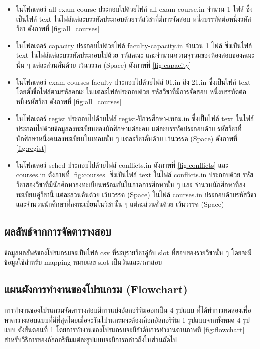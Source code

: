 \begin{itemize}
  \item ในโฟลเดอร์ all-exam-course ประกอบไปด้วยไฟล์ all-exam-course.in จำนวน 1 ไฟล์ ซึ่งเป็นไฟล์ text ในไฟล์แต่ละบรรทัดประกอบด้วยรหัสวิชาที่มีการจัดสอบ หนึ่งบรรทัดต่อหนึ่งรหัสวิชา ดังภาพที่ \ref{fig:all_courses}
  \item ในโฟลเดอร์ capacity ประกอบไปด้วยไฟล์ faculty-capacity.in จำนวน 1 ไฟล์ ซึ่งเป็นไฟล์ text ในไฟล์แต่ละบรรทัดประกอบไปด้วย รหัสคณะ และจำนวนความจุรวมของห้องสอบของคณะนั้น ๆ แต่ละส่วนคั่นด้วย เว้นวรรค (Space) ดังภาพที่ \ref{fig:capacity}
  \item ในโฟลเดอร์ exam-courses-faculty ประกอบไปด้วยไฟล์ 01.in ถึง 21.in ซึ่งเป็นไฟล์ text โดยตั้งชื่อไฟล์ตามรหัสคณะ ในแต่ละไฟล์ประกอบด้วย รหัสวิชาที่มีการจัดสอบ หนึ่งบรรทัดต่อหนึ่งรหัสวิชา ดังภาพที่ \ref{fig:all_courses} 
  \item ในโฟลเดอร์ regist ประกอบไปด้วยไฟล์ regist-ปีการศึกษา-เทอม.in ซึ่งเป็นไฟล์ text ในไฟล์ประกอบไปด้วยข้อมูลลงทะเบียนของนักศึกษาแต่ละคน แต่ละบรรทัดประกอบด้วย รหัสวิชาที่นักศึกษาหนึ่งคนลงทะเบียนในเทอมนั้น ๆ แต่ละวิชาคั่นด้วย เว้นวรรค (Space) ดังภาพที่ \ref{fig:regist}
  \item ในโฟลเดอร์ sched ประกอบไปด้วยไฟล์ conflicts.in ดังภาพที่ \ref{fig:conflicts} และ courses.in ดังภาพที่ \ref{fig:courses} ซึ่งเป็นไฟล์ text ในไฟล์ conflicts.in ประกอบด้วย รหัสวิชาสองวิชาที่มีนักศึกษาลงทะเบียนพร้อมกันในภาคการศึกษานั้น ๆ และ จำนวนนักศึกษาที่ลงทะเบียนคู่วิชานี้ แต่ละส่วนคั่นด้วย เว้นวรรค (Space) ในไฟล์ courses.in ประกอบด้วยรหัสวิชา และจำนวนนักศึกษาที่ลงทะเบียนในวิชานั้น ๆ แต่ละส่วนคั่นด้วย เว้นวรรค (Space)
\end{itemize}

\subsection{ผลลัพธ์จากการจัดตารางสอบ}
ข้อมูลผลลัพธ์ของโปรแกรมจะเป็นไฟล์ csv ที่ระบุรายวิชาคู่กับ slot ที่สอบของรายวิชานั้น ๆ โดยจะมีข้อมูลใช้สำหรับ mapping หมายเลข slot เป็นวันและเวลาสอบ

\subsection{แผนผังการทำงานของโปรแกรม (Flowchart)}
การทำงานของโปรแกรมจัดตารางสอบมีการแบ่งอัลกอริทึมออกเป็น 4 รูปแบบ
ที่ได้ทำการทดลองเพื่อหาตารางสอบแบบที่ดีที่สุดโดยเมื่อจะรันโปรแกรมจะต้องเลือกอัลกอริทึม 1 รูปแบบจากทั้งหมด 4 รูปแบบ ดังขั้นตอนที่ 1 
โดยการทำงานของโปรแกรมจะมีลำดับการทำงานตามภาพที่ \ref{fig:flowchart}
สำหรับวิธีการของอัลกอริทึมแต่ละรูปแบบจะมีการกล่าวถึงในส่วนถัดไป

